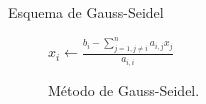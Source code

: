 \documentclass[10pt]{beamer}
\begin{document}
  \begin{frame}{Esquema de Gauss-Seidel}
    \begin{figure}[h]                  
      \begin{algorithm}[H]       
       \caption{M\'etodo de Gauss-Seidel.}
       {
        {
          $x_i \leftarrow \displaystyle\frac{b_i-\displaystyle\sum_{j=1,j\neq i}^na_{i,j}x_j}{a_{i,i}}$\\
        }
       }      
      \end{algorithm}
      \end{figure}
  \end{frame}
\end{document}

